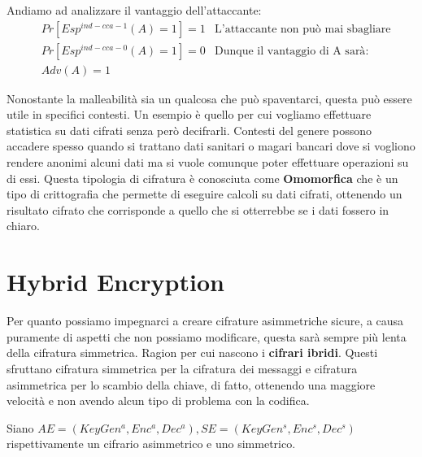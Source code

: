 Andiamo ad analizzare il vantaggio dell'attaccante:
\begin{align*}
    &Pr[Esp^{ind-cca-1}(A)=1]=1 & \text{L'attaccante non può mai sbagliare}\\
    &Pr[Esp^{ind-cca-0}(A)=1]=0
    &\text{Dunque il vantaggio di A sarà}:\\
    &Adv(A)=1
\end{align*}

Nonostante la malleabilità sia un qualcosa che può spaventarci, questa può essere utile in specifici contesti. Un esempio è quello per cui vogliamo effettuare statistica su dati cifrati senza però decifrarli. Contesti del genere possono accadere spesso quando si trattano dati sanitari o magari bancari dove si vogliono rendere anonimi alcuni dati ma si vuole comunque poter effettuare operazioni su di essi. Questa tipologia di cifratura è conosciuta come \textbf{Omomorfica} che è un tipo di crittografia che permette di eseguire calcoli su dati cifrati, ottenendo un risultato cifrato che corrisponde a quello che si otterrebbe se i dati fossero in chiaro.
\section{Hybrid Encryption}
Per quanto possiamo impegnarci a creare cifrature asimmetriche sicure, a causa puramente di aspetti che non possiamo modificare, questa sarà sempre più lenta della cifratura simmetrica. Ragion per cui nascono i \textbf{cifrari ibridi}. Questi sfruttano cifratura simmetrica per la cifratura dei messaggi e cifratura asimmetrica per lo scambio della chiave, di fatto, ottenendo una maggiore velocità e non avendo alcun tipo di problema con la codifica.

Siano $AE=(KeyGen^a, Enc^a, Dec^a), SE=(KeyGen^s, Enc^s, Dec^s)$ rispettivamente un cifrario asimmetrico e uno simmetrico. 

